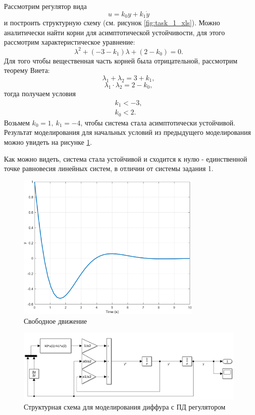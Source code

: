 Рассмотрим регулятор вида
\begin{equation*}
    u=k_0y+k_1\dot y
\end{equation*}
и построить структурную схему (см. рисунок \ref{fig:task_1_xls}). Можно аналитически
найти корни для асимптотической устойчивости, для этого рассмотрим характеристическое уравнение:
\[
    \lambda^2 + (-3 - k_1)\lambda + (2 - k_0) = 0.
\]
Для того чтобы вещественная часть корней была отрицательной, рассмотрим теорему
Виета:
\[
    \lambda_1 + \lambda_2 = 3 +k_1,
\]
\[
    \lambda_1 \cdot \lambda_2 = 2 -k_0,
\]
тогда получаем условия
\begin{equation*}
    \begin{array}{c}
        k_1<-3,\\
        k_0<2.
    \end{array}
\end{equation*}
Возьмем $k_0=1,\ k_1=-4$, чтобы система стала асимптотически устойчивой.
Результат моделирования для начальных условий из предыдущего моделирования можно увидеть
на рисунке \ref{fig:task_1_out_1}.

Как можно видеть, система стала устойчивой и сходится к нулю - единственной точке равновесия
линейных систем, в отличии от системы задания 1.
\begin{figure}[H]
    \centering
    \includegraphics[width=0.8\textwidth]{figs/task_1_out_1.png}
    \caption{Свободное движение}
    \label{fig:task_1_out_1}
\end{figure}
\begin{figure}[H]
    \centering
    \includegraphics[width=1\textwidth]{figs/task_1_slx_1.png}
    \caption{Структурная схема для моделирования диффура с ПД регулятором}
    \label{fig:task_1_xls_1}
\end{figure}


